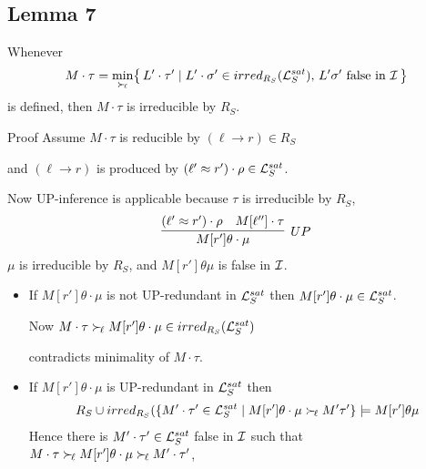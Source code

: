 \documentclass[%
handout,
]{beamer}
\begin{document}
\subsection{Lemma 7}
\begin{frame}[allowframebreaks]
    \begin{lemma}\label{irreducible}
        Whenever
        \begin{gather*}
            M\cdot\tau = \min_{\mathrel\succ_{\!\ell}}\!
            \left\{\,
            L'\cdot\tau' \mid
            L'\cdot\sigma' \in irred_{R_S}(\mathcal{L}_S^{sat}),\,
            L'\sigma'\text{ false in }\mathcal{I}\,
            \right\}
        \end{gather*}
        is defined, then $M\cdot\tau$ is irreducible by $R_S$.
    \end{lemma}

    \begin{block}{Proof}
        Assume $M\cdot\tau$ is reducible by $(\ell\to r)\in R_S$

        and $(\ell\to r)$ is produced by $(\ell'\approx r')\cdot\rho\in\mathcal{L}_S^{sat}$.

        \vspace{0.7em}
        Now UP-inference is applicable because $\tau$ is irreducible by $R_S$,
        \begin{gather*}
            \infer[UP]
            {M[r']\theta\cdot\mu}
            {(\ell'\mEQ r')\cdot\rho & M[\ell'']\cdot\tau}
        \end{gather*}
        $\mu$ is irreducible by $R_S$, and $M[r']\theta\mu${ is false in }$\mathcal{I}$.
        \hfill\lightning
    \end{block}

    \framebreak

        \begin{itemize}
            \item If $M[r']\theta\cdot\mu$ is not UP-redundant in $\mathcal{L}_S^{sat}$
            then $M[r']\theta\cdot\mu\in\mathcal{L}_S^{sat}$.

            \vspace{0.7em}
            Now $M\cdot\tau\mathrel\succ_{\!\ell}
            M[r']\theta\cdot\mu\in irred_{R_S}(\mathcal{L}_S^{sat})$

            contradicts minimality of $M\cdot\tau$.
            \hfill\lightning


            \vspace{0.7em}
            \item If $M[r']\theta\cdot\mu$ is UP-redundant in $\mathcal{L}_S^{sat}$ then
            \begin{gather*}
                R_S \cup irred_{R_S}(
                \{
                    M'\cdot\tau'\in\mathcal{L}_S^{sat}\mid
                    M[r']\theta\cdot\mu \mathrel\succ_{\!\ell} M'\tau'
                    \} \models M[r']\theta\mu
            \end{gather*}
            Hence there is $M'\cdot\tau'\in\mathcal{L}_S^{sat}$ false in $\mathcal{I}$ such that
            $M\cdot\tau\mathrel\succ_{\!\ell} M[r']\theta\cdot\mu\mathrel\succ_{\!\ell} M'\cdot\tau'$,


\end{itemize}
\end{frame}
\end{document}
